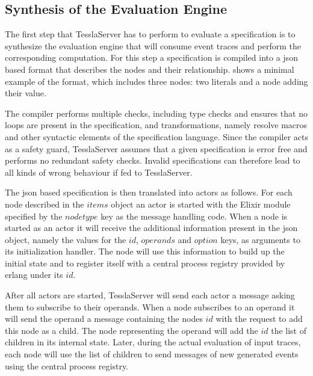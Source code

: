 \subsection{Synthesis of the Evaluation Engine}

The first step that TesslaServer has to perform to evaluate a specification is to synthesize the evaluation engine that will consume event traces and perform the corresponding computation.
For this step a specification is compiled into a \gls{json} based format that describes the nodes and their relationship.
 shows a minimal example of the format, which includes three nodes: two literals and a node adding their value.



The compiler performs multiple checks, including type checks and ensures that no loops are present in the specification, and transformations, namely resolve macros and other syntactic elements of the specification language.
Since the compiler acts as a safety guard, TesslaServer assumes that a given specification is error free and performs no redundant safety checks.
Invalid specifications can therefore lead to all kinds of wrong behaviour if fed to TesslaServer.

The \gls{json} based specification is then translated into actors as follows.
For each node described in the \(\mathit{items}\) object an actor is started with the Elixir module specified by the \(\mathit{nodetype}\) key as the message handling code.
When a node is started as an actor it will receive the additional information present in the \gls{json} object, namely the values for the \(\mathit{id}\), \(\mathit{operands}\) and \(\mathit{option}\) keys, as arguments to its initialization handler.
The node will use this information to build up the initial state and to register itself with a central process registry provided by erlang under its \(\mathit{id}\).

After all actors are started, TesslaServer will send each actor a message asking them to subscribe to their operands.
When a node subscribes to an operand it will send the operand a message containing the nodes \(\mathit{id}\) with the request to add this node as a child.
The node representing the operand will add the \(\mathit{id}\) the list of children in its internal state.
Later, during the actual evaluation of input traces, each node will use the list of children to send messages of new generated events using the central process registry.

